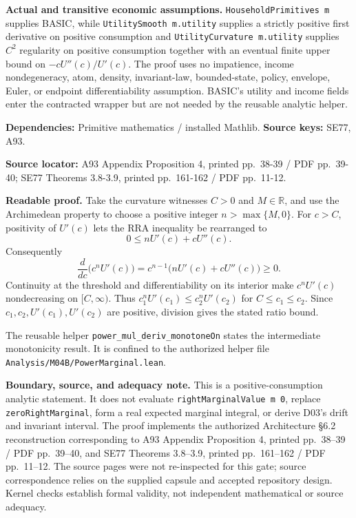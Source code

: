 \documentclass[
  11pt,
]{article}
\let\LedgerOriginalTexttt\texttt
\renewcommand{\texttt}[1]{{\small\LedgerOriginalTexttt{#1}}}
\begin{document}
\textbf{Actual and transitive economic assumptions.}
\texttt{HouseholdPrimitives\ m} supplies BASIC, while
\texttt{UtilitySmooth\ m.utility} supplies a strictly positive first
derivative on positive consumption and
\texttt{UtilityCurvature\ m.utility} supplies \(C^2\) regularity on
positive consumption together with an eventual finite upper bound on
\(-cU''(c)/U'(c)\). The proof uses no impatience, income nondegeneracy,
atom, density, invariant-law, bounded-state, policy, envelope, Euler, or
endpoint differentiability assumption. BASIC's utility and income fields
enter the contracted wrapper but are not needed by the reusable analytic
helper.

\textbf{Dependencies:} Primitive mathematics / installed Mathlib.
\textbf{Source keys:} SE77, A93.

\textbf{Source locator:} A93 Appendix Proposition 4, printed pp.~38-39 /
PDF pp.~39-40; SE77 Theorems 3.8-3.9, printed pp.~161-162 / PDF
pp.~11-12.

\textbf{Readable proof.} Take the curvature witnesses \(C>0\) and
\(M\in\mathbb R\), and use the Archimedean property to choose a positive
integer \(n>\max\{M,0\}\). For \(c>C\), positivity of \(U'(c)\) lets the
RRA inequality be rearranged to \[
  0\leq nU'(c)+cU''(c).
\] Consequently \[
  \frac{d}{dc}\bigl(c^nU'(c)\bigr)
  =c^{n-1}\bigl(nU'(c)+cU''(c)\bigr)\geq0.
\] Continuity at the threshold and differentiability on its interior
make \(c^nU'(c)\) nondecreasing on \([C,\infty)\). Thus
\(c_1^nU'(c_1)\leq c_2^nU'(c_2)\) for \(C\leq c_1\leq c_2\). Since
\(c_1,c_2,U'(c_1),U'(c_2)\) are positive, division gives the stated
ratio bound.

The reusable helper \texttt{power\_mul\_deriv\_monotoneOn} states the
intermediate monotonicity result. It is confined to the authorized
helper file \texttt{Analysis/M04B/PowerMarginal.lean}.

\textbf{Boundary, source, and adequacy note.} This is a
positive-consumption analytic statement. It does not evaluate
\texttt{rightMarginalValue\ m\ 0}, replace \texttt{zeroRightMarginal},
form a real expected marginal integral, or derive D03's drift and
invariant interval. The proof implements the authorized Architecture
§6.2 reconstruction corresponding to A93 Appendix Proposition 4, printed
pp.~38--39 / PDF pp.~39--40, and SE77 Theorems 3.8--3.9, printed
pp.~161--162 / PDF pp.~11--12. The source pages were not re-inspected
for this gate; source correspondence relies on the supplied capsule and
accepted repository design. Kernel checks establish formal validity, not
independent mathematical or source adequacy.
\end{document}
